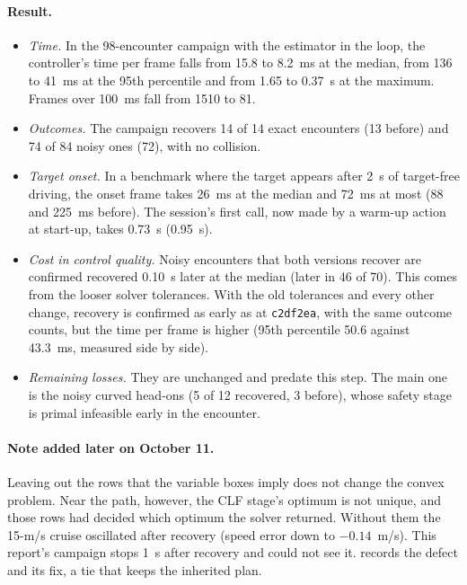 \documentclass[11pt]{article}
\begin{document}
\paragraph{Result.}
\begin{itemize}
\item \emph{Time.} In the 98-encounter campaign with the estimator in the
  loop, the controller's time per frame falls from 15.8 to 8.2~ms at the
  median, from 136 to 41~ms at the 95th percentile and from 1.65 to 0.37~s
  at the maximum. Frames over 100~ms fall from 1510 to 81.
\item \emph{Outcomes.} The campaign recovers 14 of 14 exact encounters (13
  before) and 74 of 84 noisy ones (72), with no collision.
\item \emph{Target onset.} In a benchmark where the target appears after 2~s
  of target-free driving, the onset frame takes 26~ms at the median and
  72~ms at most (88 and 225~ms before). The session's first call, now made
  by a warm-up action at start-up, takes 0.73~s (0.95~s).
\item \emph{Cost in control quality.} Noisy encounters that both versions
  recover are confirmed recovered 0.10~s later at the median (later in 46
  of 70). This comes from the looser solver tolerances. With the old
  tolerances and every other change, recovery is confirmed as early as at
  \texttt{c2df2ea}, with the same outcome counts, but the time per frame is
  higher (95th percentile 50.6 against 43.3~ms, measured side by side).
\item \emph{Remaining losses.} They are unchanged and predate this step. The
  main one is the noisy curved head-ons (5 of 12 recovered, 3 before),
  whose safety stage is primal infeasible early in the encounter.
\end{itemize}

\paragraph{Note added later on October 11.}
Leaving out the rows that the variable boxes imply does not change the
convex problem. Near the path, however, the CLF stage's optimum is not
unique, and those rows had decided which optimum the solver returned.
Without them the 15-m/s cruise oscillated after recovery (speed error down
to $-0.14$~m/s). This report's campaign stops 1~s after recovery and could
not see it.  records the defect
and its fix, a tie that keeps the inherited plan.
\end{document}
